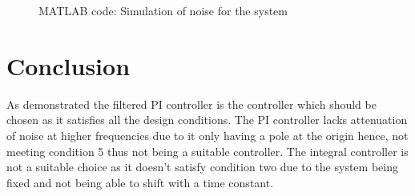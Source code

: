 \documentclass[
	12pt, %
]{fphw}
\begin{document}
\begin{figure}[!htp]
    
    \caption{MATLAB code: Simulation of noise for the system}
    \label{noise}
\end{figure}
%
\section{Conclusion}
As demonstrated the filtered PI controller is the controller which should be chosen as it satisfies all the design conditions. The PI controller lacks attenuation of noise at higher frequencies due to it only having a pole at the origin hence, not meeting condition 5 thus not being a suitable controller. The integral controller is not a suitable choice as it doesn't satisfy condition two due to the system being fixed and not being able to shift with a time constant.

\newpage
\printbibliography

\end{document}
